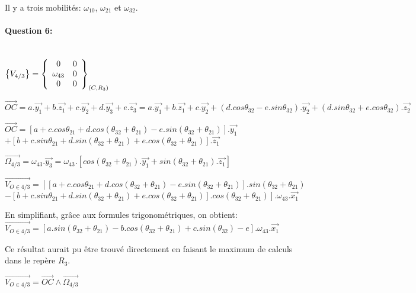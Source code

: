 Il y a trois mobilités: $\omega_{10}$, $\omega_{21}$ et $\omega_{32}$.


\paragraph{Question 6:} ~\ \\

$\left\{V_{4/3}\right\}=\left\{\begin{array}{c c} 0 & 0\\ \omega_{43} & 0 \\ 0 & 0 \end{array} \right\}_{(C,R_3)}$

$\overrightarrow{OC}=a.\overrightarrow{y_1}+b.\overrightarrow{z_1}+c.\overrightarrow{y_2}+d.\overrightarrow{y_3}+e.\overrightarrow{z_3}=a.\overrightarrow{y_1}+b.\overrightarrow{z_1}+c.\overrightarrow{y_2}+(d.cos \theta_{32}-e.sin \theta_{32}).\overrightarrow{y_2}+(d.sin \theta_{32}+e.cos \theta_{32}).\overrightarrow{z_2}$

$\overrightarrow{OC}=\left[a+c.cos \theta_{21}+d.cos (\theta_{32}+\theta_{21})-e.sin (\theta_{32}+\theta_{21})\right].\overrightarrow{y_1}$\\
$+\left[b+c.sin \theta_{21}+d.sin (\theta_{32}+\theta_{21})+e.cos (\theta_{32}+\theta_{21})\right].\overrightarrow{z_1}$

$\overrightarrow{\Omega_{4/3}}=\omega_{43}.\overrightarrow{y_3}=\omega_{43}.\left[cos(\theta_{32}+\theta_{21}).\overrightarrow{y_1}+sin(\theta_{32}+\theta_{21}).\overrightarrow{z_1}\right]$

$\overrightarrow{V_{O\in4/3}}=\left[\left[a+c.cos \theta_{21}+d.cos (\theta_{32}+\theta_{21})-e.sin (\theta_{32}+\theta_{21})\right].sin (\theta_{32}+\theta_{21})\right.$\\$\left.-\left[b+c.sin \theta_{21}+d.sin (\theta_{32}+\theta_{21})+e.cos (\theta_{32}+\theta_{21})\right].cos (\theta_{32}+\theta_{21})\right].\omega_{43}.\overrightarrow{x_1}$

En simplifiant, grâce aux formules trigonométriques, on obtient:
$\overrightarrow{V_{O\in4/3}}=\left[a.sin (\theta_{32}+\theta_{21})-b.cos (\theta_{32}+\theta_{21})+c.sin (\theta_{32})-e\right].\omega_{43}.\overrightarrow{x_1}$

Ce résultat aurait pu être trouvé directement en faisant le maximum de calculs dans le repère $R_3$.

$\overrightarrow{V_{O\in4/3}}=\overrightarrow{OC}\wedge\overrightarrow{\Omega_{4/3}}$

